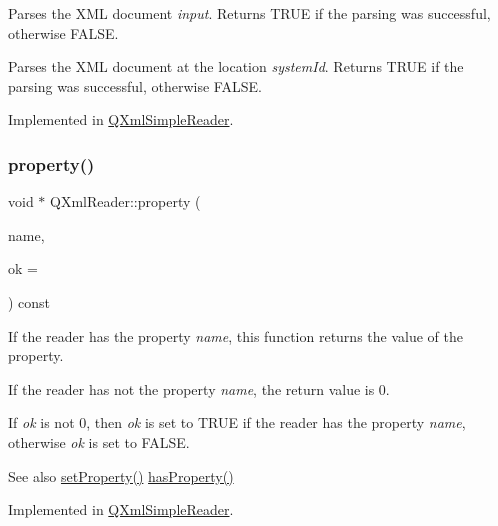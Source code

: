 Parses the X\+ML document {\itshape input}. Returns T\+R\+UE if the parsing was successful, otherwise F\+A\+L\+SE.

Parses the X\+ML document at the location {\itshape system\+Id}. Returns T\+R\+UE if the parsing was successful, otherwise F\+A\+L\+SE. 

Implemented in \mbox{\hyperlink{class_q_xml_simple_reader_a664631907374b7d0f7b492ef65f418d9}{Q\+Xml\+Simple\+Reader}}.

\mbox{\label{class_q_xml_reader_a88ea75a8b783f8ef6959d9d83402c579}} 
\subsubsection{\texorpdfstring{property()}{property()}}
{\footnotesize\ttfamily void $\ast$ Q\+Xml\+Reader\+::property (\begin{DoxyParamCaption}\item[{const \mbox{\hyperlink{class_q_string}{Q\+String}} \&}]{name,  }\item[{bool $\ast$}]{ok = {} }\end{DoxyParamCaption}) const\hspace{0.3cm}{\ttfamily [pure virtual]}}

If the reader has the property {\itshape name}, this function returns the value of the property.

If the reader has not the property {\itshape name}, the return value is 0.

If {\itshape ok} is not 0, then {\itshape ok} is set to T\+R\+UE if the reader has the property {\itshape name}, otherwise {\itshape ok} is set to F\+A\+L\+SE.

\begin{DoxySeeAlso}{See also}
\mbox{\hyperlink{class_q_xml_reader_aa02ae81ff9636b9961bc333a68ecffa4}{set\+Property()}} \mbox{\hyperlink{class_q_xml_reader_ac26bf52bfab045196e8adf980e92bab6}{has\+Property()}} 
\end{DoxySeeAlso}


Implemented in \mbox{\hyperlink{class_q_xml_simple_reader_a06e5d853a8299d74a0a3adc56e0a02ee}{Q\+Xml\+Simple\+Reader}}.

\mbox{\label{class_q_xml_reader_a767bc5a20ea120ffc2d60f5c42fb28cd}} 
